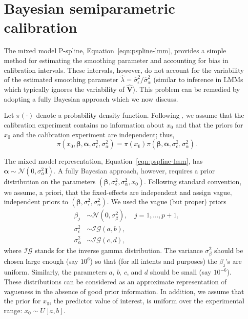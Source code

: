 \documentclass[cmfont,usenames,dvipsnames,leqno]{afit-etd}\usepackage[]{graphicx}\usepackage[]{color}
\newcommand{\mc}[1]{\ensuremath{\mathcal{#1}}}
\newcommand{\wh}[1]{\ensuremath{\widehat{#1}}}
\begin{document}
\section{Bayesian semiparametric calibration}
\label{sec:pspline-bayesian}
The mixed model \ac{P-spline}, Equation~\eqref{eqn:pspline-lmm}, provides a simple method for estimating the smoothing parameter and accounting for bias in calibration intervals. These intervals, however, do not account for the variability of the estimated smoothing parameter $\wh{\lambda} = \wh{\sigma}_\epsilon^2/\wh{\sigma}_\alpha^2$ (similar to inference in \ac{LMM}s which typically ignores the variability of $\wh{\bm{V}}$). This problem can be remedied by adopting a fully Bayesian approach which we now discuss. 

Let $\pi(\cdot)$ denote a probability density function. Following \citet{hoadley_bayesian_1970}, we assume that the calibration experiment contains no information about $x_0$ and that the priors for $x_0$ and the calibration experiment are independent; thus,
\begin{equation*}
  \pi(x_0, \bm{\beta}, \bm{\alpha}, \sigma_\epsilon^2, \sigma_\alpha^2) = \pi(x_0)\pi(\bm{\beta}, \bm{\alpha}, \sigma_\epsilon^2, \sigma_\alpha^2).
\end{equation*}

The mixed model representation, Equation~\eqref{eqn:pspline-lmm}, has $\bm{\alpha} \sim \mc{N}(0, \sigma_\alpha^2\bm{I})$. A fully Bayesian approach, however, requires a prior distribution on the parameters $(\bm{\beta}, \sigma_\epsilon^2, \sigma_\alpha^2, x_0)$. Following standard convention, we assume, a priori, that the fixed-effects are independent and assign vague, independent priors to $(\bm{\beta}, \sigma_\epsilon^2, \sigma_\alpha^2)$. We used the vague (but proper) priors
\begin{align*}
  \beta_j &\sim \mc{N}\left(0, \sigma_\beta^2\right), \quad j = 1, \dotsc, p+1, \\
  \sigma_\epsilon^2 &\sim \mc{IG}\left(a, b\right), \\
  \sigma_\alpha^2 &\sim \mc{IG}\left(c, d\right),
\end{align*}
where $\mc{IG}$ stands for the inverse gamma distribution. The variance $\sigma_\beta^2$ should be chosen large enough (say $10^6$) so that (for all intents and purposes) the $\beta_j$'s are uniform. Similarly, the parameters $a$, $b$, $c$, and $d$ should be small (say $10^{-6}$). These distributions can be considered as an approximate representation of vagueness in the absence of good prior information. In addition, we assume that the prior for $x_0$, the predictor value of interest, is uniform over the experimental range: $x_0 \sim U[a, b]$. 
\end{document}
